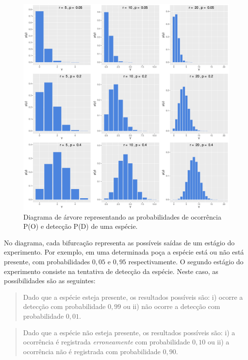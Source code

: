 \documentclass[
]{book}
\begin{document}
\begin{figure}

{\centering \includegraphics{probest-cambientais_files/figure-latex/unnamed-chunk-200-1} 

}

\caption{Diagrama de árvore representando as probabilidades de ocorrência P(O) e detecção P(D) de uma espécie.}\label{fig:unnamed-chunk-200}
\end{figure}

No diagrama, cada bifurcação representa as possíveis saídas de um estágio do experimento. Por exemplo, em uma determinada poça a espécie está ou não está presente, com probabilidades \(0,05\) e \(0,95\) respectivamente. O segundo estágio do experimento consiste na tentativa de detecção da espécie. Neste caso, as possibilidades são as seguintes:

\begin{quote}
Dado que a espécie esteja presente, os resultados possíveis são: i) ocorre a detecção com probabilidade \(0,99\) ou ii) não ocorre a detecção com probabilidade \(0,01\).
\end{quote}

\begin{quote}
Dado que a espécie não esteja presente, os resultados possíveis são: i) a ocorrência é registrada \emph{erroneamente} com probabilidade \(0,10\) ou ii) a ocorrência não é registrada com probabilidade \(0,90\).
\end{quote}
\end{document}
